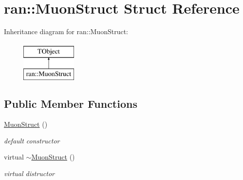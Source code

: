 \hypertarget{structran_1_1MuonStruct}{\section{ran\-:\-:Muon\-Struct Struct Reference}
\label{structran_1_1MuonStruct}
}
Inheritance diagram for ran\-:\-:Muon\-Struct\-:\begin{figure}[H]
\begin{center}
\leavevmode
\includegraphics[height=2.000000cm]{structran_1_1MuonStruct}
\end{center}
\end{figure}
\subsection*{Public Member Functions}
\begin{DoxyCompactItemize}
\item 
\hypertarget{structran_1_1MuonStruct_af62411bcdf5d93802b07f06116c8363f}{\hyperlink{structran_1_1MuonStruct_af62411bcdf5d93802b07f06116c8363f}{Muon\-Struct} ()}\label{structran_1_1MuonStruct_af62411bcdf5d93802b07f06116c8363f}

\begin{DoxyCompactList}\small\item\em default constructor \end{DoxyCompactList}\item 
\hypertarget{structran_1_1MuonStruct_a1059cb8528a5e851b4c6566d84634d66}{virtual \hyperlink{structran_1_1MuonStruct_a1059cb8528a5e851b4c6566d84634d66}{$\sim$\-Muon\-Struct} ()}\label{structran_1_1MuonStruct_a1059cb8528a5e851b4c6566d84634d66}

\begin{DoxyCompactList}\small\item\em virtual distructor \end{DoxyCompactList}\end{DoxyCompactItemize}
